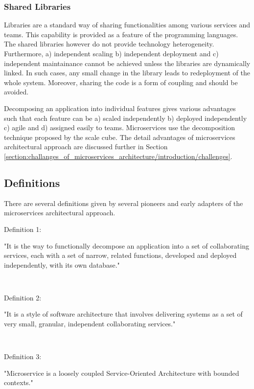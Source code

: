 \subsubsection{Shared Libraries}\label{section:context/microservices_architecture_style/decompostion_of_an_application/shared_libraries}
Libraries are a standard way of sharing functionalities among various services and teams. This capability is provided as a feature of the programming languages. The shared libraries however do not provide technology heterogeneity. Furthermore,  a) independent scaling b) independent deployment and c) independent maintainance cannot be achieved unless the libraries are dynamically linked. In such cases, any small change in the library leads to redeployment of the whole system. Moreover, sharing the code is a form of coupling and should be avoided.

Decomposing an application into individual features gives various advantages such that each feature can be a) scaled independently b) deployed independently c) agile and d) assigned easily to teams. Microservices use the decomposition technique proposed by the scale cube. The detail advantages of microservices architectural approach are discussed further in Section \ref{section:challanges_of_microservices_architecture/introduction/challenges}.
\subsection{Definitions}\label{section:context/microservices_architecture_style/definitions}
There are several definitions given by several pioneers and early adapters of the microservices architectural approach.
\\
\begin{shaded}Definition 1: \cite{Richardson:2014ac} \end{shaded}
"It is the way to functionally decompose an application into a set of collaborating services, each with a set of narrow, related functions, developed and deployed independently, with its own database."

\\
\begin{shaded}Definition 2: \cite{Wootton:2014aa}\end{shaded}
"It is a style of software architecture that involves delivering systems as a set of very small, granular, independent collaborating services."


\\
\begin{shaded}Definition 3: \cite{Cockcroft:2015aa}\end{shaded}
"Microservice is a loosely coupled Service-Oriented Architecture with bounded contexts."


